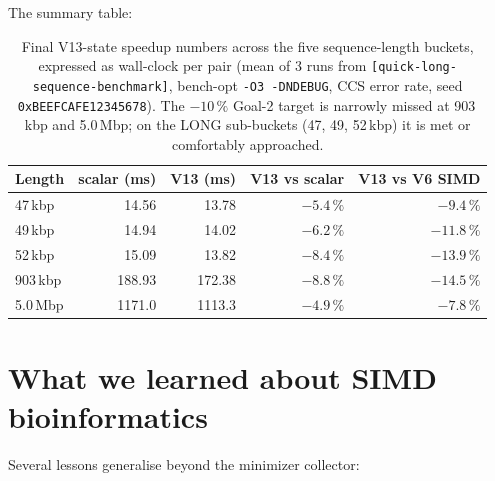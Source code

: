 The summary table:

\begin{table}[ht]
  \centering
  \small
  \begin{tabular}{lrrrr}
    \toprule
    Length     & scalar (ms) & V13 (ms) & V13 vs scalar & V13 vs V6 SIMD \\
    \midrule
    47\,kbp   &  14.56  & 13.78 & $-5.4\,\%$ & $-9.4\,\%$ \\
    49\,kbp   &  14.94  & 14.02 & $-6.2\,\%$ & $-11.8\,\%$ \\
    52\,kbp   &  15.09  & 13.82 & $-8.4\,\%$ & $-13.9\,\%$ \\
    903\,kbp  & 188.93  & 172.38 & $-8.8\,\%$ & $-14.5\,\%$ \\
    5.0\,Mbp  & 1171.0  & 1113.3 & $-4.9\,\%$ & $-7.8\,\%$ \\
    \bottomrule
  \end{tabular}
  \caption{Final V13-state speedup numbers across the five
    sequence-length buckets, expressed as wall-clock per pair
    (mean of 3 runs from
    \texttt{[quick-long-sequence-benchmark]}, bench-opt
    \texttt{-O3 -DNDEBUG}, CCS error rate, seed
    \texttt{0xBEEFCAFE12345678}). The $-10\,\%$ Goal-2 target is
    narrowly missed at 903\,kbp and 5.0\,Mbp; on the LONG sub-buckets
    (47, 49, 52\,kbp) it is met or comfortably approached.}
  \label{tab:final-numbers}
\end{table}

\section{What we learned about SIMD bioinformatics}
\label{sec:lessons}

Several lessons generalise beyond the minimizer collector:

